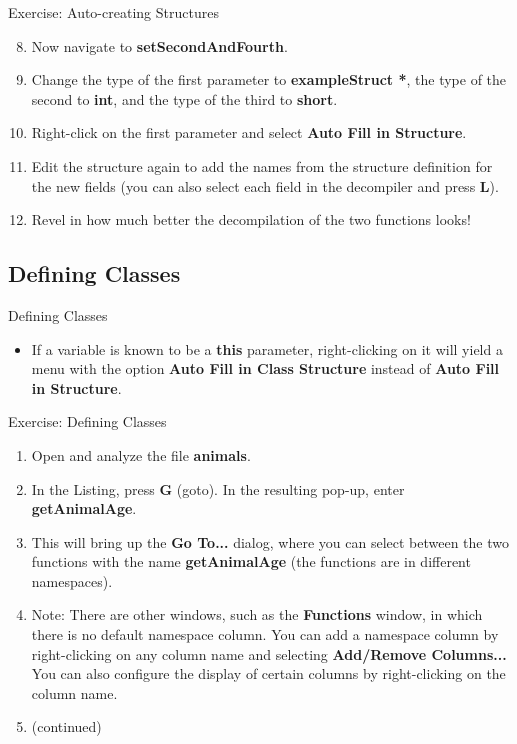 \documentclass{beamer}
\begin{document}
\begin{frame}
\begin{block}{Exercise: Auto-creating Structures}
\begin{enumerate}
\setcounter{enumi}{7}
\item Now navigate to \textbf{setSecondAndFourth}.
\item Change the type of the first parameter to \textbf{exampleStruct *}, the type of the second to \textbf{int}, and the type of the third to \textbf{short}.
\item Right-click on the first parameter and select \textbf{Auto Fill in Structure}.
\item Edit the structure again to add the names from the structure definition for the new fields (you can also select each field in the decompiler and press \textbf{L}).
\item Revel in how much better the decompilation of the two functions looks!
\end{enumerate}
\end{block}
\end{frame}

\subsection{Defining Classes}
\begin{frame}
\begin{block}{Defining Classes}
\begin{itemize}
\item If a variable is known to be a \textbf{this} parameter, right-clicking on it will yield a menu with the option \textbf{Auto Fill in Class Structure} instead
of \textbf{Auto Fill in Structure}.
\end{itemize}
\end{block}
\end{frame}

\begin{frame}
\begin{block}{Exercise: Defining Classes}
\begin{enumerate}
\item Open and analyze the file \textbf{animals}.
\item In the Listing, press \textbf{G} (goto).  In the resulting pop-up, enter \textbf{getAnimalAge}.  \item This will bring up the \textbf{Go To...} dialog, where you can
select between the two functions with the name \textbf{getAnimalAge} (the functions are in different namespaces).
\item[] Note: There are other windows, such as the \textbf{Functions} window, in which there is no default namespace column.  You can add a namespace column by right-clicking
on any column name and selecting \textbf{Add/Remove Columns...}  You can also configure the display of certain columns by right-clicking on the column name.
\item[] (continued)
\end{enumerate}
\end{block}
\end{frame}
\end{document}
